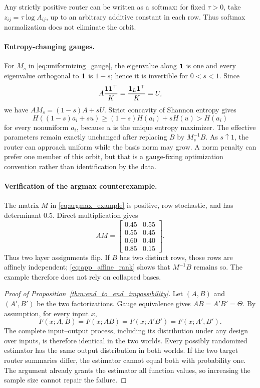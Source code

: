 Any strictly positive router can be written as a softmax: for fixed
$\tau>0$, take $z_{ij}=\tau\log A_{ij}$, up to an arbitrary additive constant
in each row.  Thus softmax normalization does not eliminate the orbit.

\paragraph{Entropy-changing gauges.}
For $M_s$ in \eqref{eq:uniformizing_gauge}, the eigenvalue along
$\mathbf{1}$ is one and every eigenvalue orthogonal to $\mathbf{1}$ is $1-s$; hence it
is invertible for $0<s<1$.  Since
\begin{equation}
  A\frac{\mathbf{1}\mathbf{1}^\top}{K}
  =\frac{\mathbf{1}_L\mathbf{1}^\top}{K}
  =U,
\end{equation}
we have $AM_s=(1-s)A+sU$.  Strict concavity of Shannon entropy gives
\begin{equation}
 H((1-s)a_i+su)
 \ge(1-s)H(a_i)+sH(u)>H(a_i)
\end{equation}
for every nonuniform $a_i$, because $u$ is the unique entropy maximizer.
The effective parameters remain exactly unchanged after replacing $B$ by
$M_s^{-1}B$.  As $s\uparrow1$, the router can approach uniform while the
basis norm may grow.  A norm penalty can prefer one member of this orbit, but
that is a gauge-fixing optimization convention rather than identification by
the data.

\paragraph{Verification of the argmax counterexample.}
The matrix $M$ in \eqref{eq:argmax_example} is positive, row
stochastic, and has determinant $0.5$.  Direct multiplication gives
\begin{equation}
 AM=
 \begin{bmatrix}
 0.45&0.55\\
 0.55&0.45\\
 0.60&0.40\\
 0.85&0.15
 \end{bmatrix}.
\end{equation}
Thus two layer assignments flip.  If $B$ has two distinct rows, those rows are
affinely independent; \eqref{eq:app_affine_rank} shows that
$M^{-1}B$ remains so.  The example therefore does not rely on collapsed
bases.

\begin{proof}[Proof of Proposition~\ref{thm:end_to_end_impossibility}]
Let $(A,B)$ and $(A',B')$ be the two factorizations.  Gauge equivalence gives
$AB=A'B'=\Theta$.  By assumption, for every input $x$,
\begin{equation}
  F(x;A,B)=F(x;AB)=F(x;A'B')=F(x;A',B').
\end{equation}
The complete input--output process, including its distribution under any
design over inputs, is therefore identical in the two worlds.  Every
possibly randomized estimator has the same output distribution in both
worlds.  If the two target router summaries differ, the estimator cannot equal
both with probability one.  The argument already grants the estimator all
function values, so increasing the sample size cannot repair the failure.
\end{proof}

